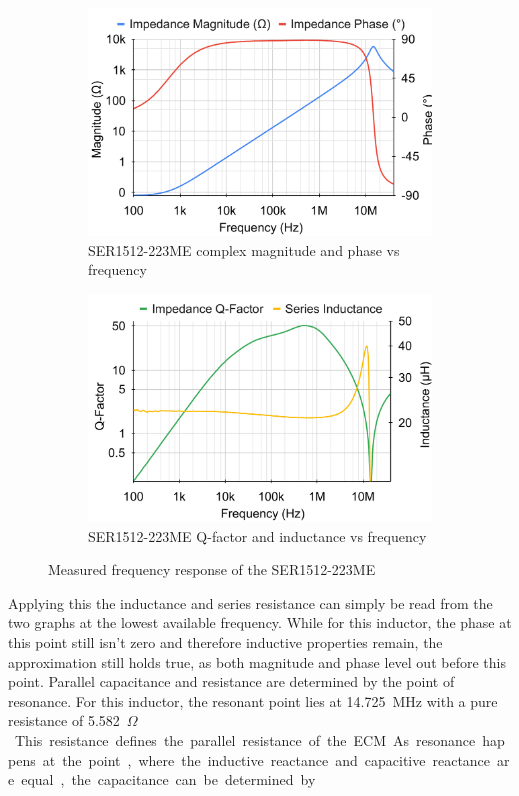 \begin{figure}[]
    \begin{subfigure}[b]{0.50\textwidth}
        \includegraphics[width=\textwidth]{Bilder/Kapitel3/SER223_BodePlot.pdf}
        \caption{SER1512-223ME complex magnitude and phase vs frequency}
    \end{subfigure}
    \begin{subfigure}[b]{0.50\textwidth}
        \includegraphics[width=\textwidth]{Bilder/Kapitel3/SER223_QLPlot.pdf}
        \caption{SER1512-223ME \ac{Q-factor} and inductance vs frequency}
    \end{subfigure}
    \caption{Measured frequency response of the SER1512-223ME}
    \label{fig:bode_100_measurements}							
\end{figure}
Applying this the inductance and series resistance can simply be read from the two graphs at the lowest available frequency. While for this inductor, the phase at this point still isn't zero and therefore inductive properties remain, the approximation still holds true, as both magnitude and phase level out before this point. Parallel capacitance and resistance are determined by the point of resonance. For this inductor, the resonant point lies at \SI{14,725}{\mega\Hz} with a pure resistance of \SI{5,582}{\kilo$\Omega$}. This resistance defines the parallel resistance of the \ac{ECM}. As resonance happens at the point, where the inductive reactance and capacitive reactance are equal, the capacitance can be determined by
